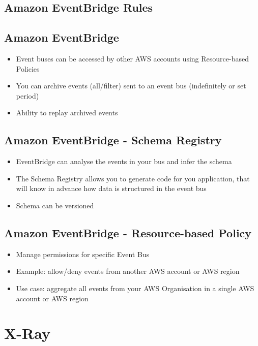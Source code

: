 \subsection{Amazon EventBridge Rules}

\subsection{Amazon EventBridge}
\begin{itemize}
    \item Event buses can be accessed by other AWS accounts using Resource-based Policies
    \item You can archive events (all/filter) sent to an event bus (indefinitely or set period)
    \item Ability to replay archived events
\end{itemize}

\subsection{Amazon EventBridge - Schema Registry}
\begin{itemize}
    \item EventBridge can analyse the events in your bus and infer the schema
    \item The Schema Registry allows you to generate code for you application, that will know in advance how data is structured in the event bus
    \item Schema can be versioned
\end{itemize}

\subsection{Amazon EventBridge - Resource-based Policy}
\begin{itemize}
    \item Manage permissions for specific Event Bus
    \item Example: allow/deny events from another AWS account or AWS region
    \item Use case: aggregate all events from your AWS Organisation in a single AWS account or AWS region
\end{itemize}


\section{X-Ray}

